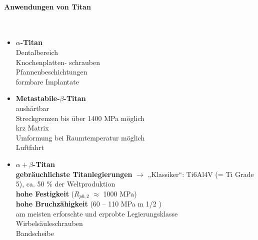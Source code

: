 \documentclass[12pt,twocolumn]{article}
\begin{document}
    \paragraph{Anwendungen von Titan}\mbox{}\\
    \begin{minipage}[t]{0.5\columnwidth}
        \begin{itemize}[label={}, leftmargin=*, itemsep=0.01em]
            \item \textbf{$\alpha$-Titan} \\ Dentalbereich \\ Knochenplatten- schrauben \\ Pfannenbeschichtungen \\ formbare Implantate
        \end{itemize}
    \end{minipage}\hfill
    \begin{minipage}[t]{0.5\columnwidth}
        \begin{itemize}[label={}, leftmargin=*, itemsep=0.01em]
            \item \textbf{Metastabile-$\beta$-Titan} \\ aushärtbar \\ Streckgrenzen bis über 1400 MPa möglich \\ krz Matrix \\ Umformung bei Raumtemperatur möglich \\ Luftfahrt
        \end{itemize}
    \end{minipage}\hfill
    \begin{minipage}[t]{1\columnwidth}
        \begin{itemize}[label={}, leftmargin=*,  itemsep=0.01em]
            \item \textbf{$\alpha+\beta$-Titan} \\ \textbf{gebräuchlichste Titanlegierungen} $\rightarrow$ „Klassiker“: Ti6Al4V (= Ti Grade 5), ca. 50 \% der Weltproduktion \\ \textbf{hohe Festigkeit} ($R_{p0,2}$ $\approx$ 1000 MPa) \\ \textbf{hohe Bruchzähigkeit} (60 – 110 MPa m 1/2 ) \\ am meisten erforschte und erprobte Legierungsklasse \\ Wirbelsäuleschrauben \\ Bandscheibe
        \end{itemize} 
    \end{minipage}\hfill
\end{document}
